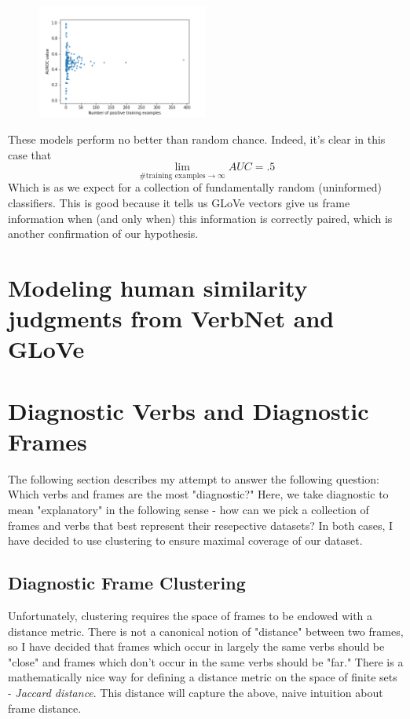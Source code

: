 \documentclass[a4paper]{article}
\begin{document}
\begin{figure}[H]
	\centering
	\includegraphics[width=0.5\textwidth]{auc_scatter5rand.png}
	\caption{\label{fig:frog} }
\end{figure}

These models perform no better than random chance. Indeed, it's clear in this case that 
\[  \lim_{\# \text{training examples} \rightarrow \infty} AUC = .5 \]
Which is as we expect for a collection of fundamentally random (uninformed) classifiers. This is good because it tells us GLoVe vectors give us frame information when (and only when) this information is correctly paired, which is another confirmation of our hypothesis.

\section{Modeling human similarity judgments from VerbNet and GLoVe}


\section{Diagnostic Verbs and Diagnostic Frames}

The following section describes my attempt to answer the following question: Which verbs and frames are the most "diagnostic?" Here, we take diagnostic to mean "explanatory" in the following sense - how can we pick a collection of frames and verbs that best represent their resepective datasets? In both cases, I have decided to use clustering to ensure maximal coverage of our dataset.

\subsection{Diagnostic Frame Clustering}

Unfortunately, clustering requires the space of frames to be endowed with a distance metric. There is not a canonical notion of "distance" between two frames, so I have decided that frames which occur in largely the same verbs should be "close" and frames which don't occur in the same verbs should be "far." There is a mathematically nice way for defining a distance metric on the space of finite sets - \textit{Jaccard distance}. This distance will capture the above, naive intuition about frame distance.
\end{document}
